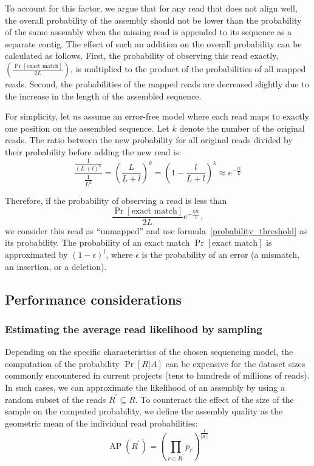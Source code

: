 \documentclass[12pt,\mydriver]{thesis}
\begin{document}
To account for this factor, we argue that for any read that does not
align well, the overall probability of the assembly should not be
lower than the probability of the same assembly when the missing read
is appended to its sequence as a separate contig. The effect of such an addition on the
overall probability can be calculated as follows.  First, the
probability of observing this read exactly,
$\left(\frac{\Pr[\text{exact match}]}{2L}\right)$, is multiplied to
the product of the probabilities of all mapped reads.  Second, the
probabilities of the mapped reads are decreased slightly due to the
increase in the length of the assembled sequence.

For simplicity, let us assume an error-free model where each read maps
to exactly one position on the assembled sequence.  Let $k$ denote the
number of the original reads. The ratio between the new probability
for all original reads divided by their probability before adding the
new read is:
\[
  \frac{\frac{1}{(L + l)^k}}{\frac{1}{L^k}} = \left(\frac{L}{L + l}\right)^k = \left(1-\frac{l}{L + l}\right)^k \approx e^{-\frac{lk}{L}}
\]

Therefore, if the probability of observing a read is less than
\begin{equation}
  \label{probability_threshold}
  \frac{\Pr[\text{exact match}]}{2L}e^{-\frac{l\left\vert R\right\vert}{L}},
\end{equation}
we consider this read as ``unmapped'' and
use formula~\eqref{probability_threshold} as its probability.  The probability
of an exact match $\Pr[\text{exact match}]$ is approximated by
$\left(1 - \epsilon\right)^{l}$, where $\epsilon$ is the probability of
an error (a mismatch, an insertion, or a deletion).

\subsection{Performance considerations}
\subsubsection{Estimating the average read likelihood by sampling}
\label{sampling_reads}
Depending on the specific characteristics of the chosen sequencing model, the computation of the probability $\Pr[R \vert A]$ can be expensive
for the dataset sizes commonly encountered in current projects (tens
to hundreds of millions of reads).  In such cases, we can approximate
the likelihood of an assembly by using a random subset of the reads
$R^\prime \subseteq R$. To counteract the effect of the size of the
sample on the computed probability, we define the assembly quality as
the geometric mean of the individual read probabilities:
\begin{equation}
  \label{average_probability}
  \operatorname{AP}(R^\prime) =
  \left(\prod_{r \in R^\prime} p_r\right)^{\frac{1}{\left|R^\prime\right|}}
\end{equation}
\end{document}
